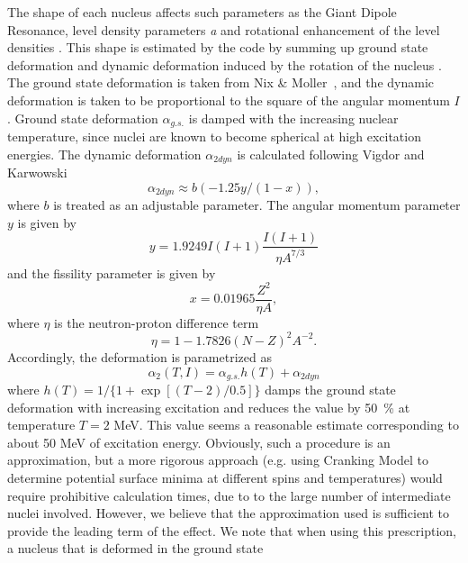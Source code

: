 The shape of each nucleus affects such parameters as the Giant Dipole
Resonance, level density parameters \emph{a} and rotational enhancement of
the level densities%
. This shape is estimated by the code by summing up
ground state deformation and dynamic deformation induced by the rotation of
the nucleus . The ground state deformation
is taken from Nix \& Moller~\cite{masses}, and the dynamic deformation is
taken to be proportional to the square of the angular momentum $I$. Ground
state deformation $\alpha_{g.s.}$ is damped with the increasing nuclear
temperature, since nuclei are known to become spherical at high excitation
energies. The dynamic deformation $\alpha_{2dyn}$ is calculated following
Vigdor and Karwowski \cite{VK}
\begin{equation}
\alpha_{2dyn}\approx b(-1.25y/(1-x)),  \label{defor}
\end{equation}
\noindent where $b$ is treated as an adjustable parameter. The angular
momentum parameter $y$ is given by
\begin{equation}
y=1.9249I(I+1)%
\frac{I(I+1)}{\eta A^{7/3}}
\end{equation}
and the fissility parameter is given by
\begin{equation}
x=0.01965\frac{Z^{2}}{\eta A},
\end{equation}
\noindent where $\eta$ is the neutron-proton difference term
\begin{equation}
\eta=1-1.7826(N-Z)^{2}A^{-2}.
\end{equation}
Accordingly, the deformation is parametrized as
\begin{equation}
\alpha_{2}(T,I)=\alpha_{g.s.}h(T)+\alpha_{2dyn}  \label{totdefor}
\end{equation}
\noindent where $h(T)=1/\{1+\exp[(T-2)/0.5]\}$ damps the ground state
deformation with increasing excitation and reduces the value by 50~\% at
temperature $T=2$ MeV. This value seems a reasonable estimate corresponding
to about 50 MeV of excitation energy. Obviously, such a procedure is an
approximation, but a more rigorous approach (e.g. using Cranking Model to
determine potential surface minima at different spins and temperatures)
would require prohibitive calculation times, due to to the large number of
intermediate nuclei involved. However, we believe that the approximation
used is sufficient to provide the leading term of the effect. We note that
when using this prescription, a nucleus that is deformed in the ground state
